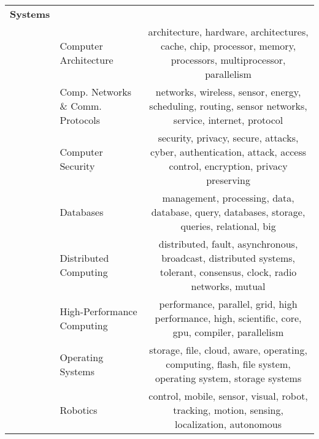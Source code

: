 \documentclass[reprint, twocolumn, aps, nofootinbib, superscriptaddress, longbibliography]{revtex4-1}
\begin{document}
\begin{table*}
\begin{tabularx}{\textwidth}{llC}
                         \textbf{Systems} &                                          &                                                                                                                                    \\
                              &                       Computer Architecture &                        architecture, hardware, architectures, cache, chip, processor, memory, processors, multiprocessor, parallelism \\
                              & Comp. Networks \& Comm. Protocols &                                 networks, wireless, sensor, energy, scheduling, routing, sensor networks, service, internet, protocol \\
                              &                           Computer Security &                     security, privacy, secure, attacks, cyber, authentication, attack, access control, encryption, privacy preserving \\
                              &                                   Databases &                                           management, processing, data, database, query, databases, storage, queries, relational, big \\
                              &                       Distributed Computing &                  distributed, fault, asynchronous, broadcast, distributed systems, tolerant, consensus, clock, radio networks, mutual \\
                              &                  High-Performance Computing &                                     performance, parallel, grid, high performance, high, scientific, core, gpu, compiler, parallelism \\
                              &                           Operating Systems &                              storage, file, cloud, aware, operating, computing, flash, file system, operating system, storage systems \\
                              &                                    Robotics &                                           control, mobile, sensor, visual, robot, tracking, motion, sensing, localization, autonomous \\
                              \midrule


\end{tabularx}
\end{table*}
\end{document}
